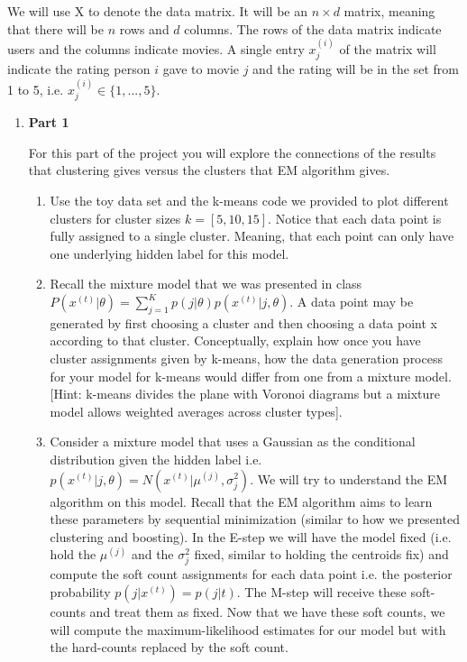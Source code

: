 We will use X to denote the data matrix. It will be an $n \times d$ matrix, meaning that there will be $n$ rows and $d$ columns. The rows of the data matrix indicate users and the columns indicate movies. A single entry $x^{(i)}_{j}$ of the matrix will indicate the rating person $i$ gave to movie $j$ and the rating will be in the set from 1 to 5, i.e. $x^{(i)}_{j} \in \{ 1, ..., 5\}$.
\begin{enumerate}

\item {\bf Part 1}

For this part of the project you will explore the connections of the results that clustering gives versus the clusters that EM algorithm gives.

\begin{enumerate}
  \item Use the toy data set and the k-means code we provided to plot different clusters for cluster sizes $k = [5, 10, 15]$. Notice that each data point is fully assigned to a single cluster. Meaning, that each point can only have one underlying hidden label for this model.
  \item Recall the mixture model that we was presented in class $P(x^{(t)} | \theta) = \sum^{K}_{j=1} p(j| \theta)p(x^{(t)} | j, \theta) $. A data point may be generated by first choosing a cluster and then choosing a data point x according to that cluster. Conceptually, explain how once you have cluster assignments given by k-means, how the data generation process for your model for k-means would differ from one from a mixture model. [Hint: k-means divides the plane with Voronoi diagrams but a mixture model allows weighted averages across cluster types].
  \item Consider a mixture model that uses a Gaussian as the conditional distribution given the hidden label i.e. $p(x^{(t)} | j, \theta) = N(x^{(t)}| \mu^{(j)}, \sigma^2_{j})$.  We will try to understand the EM algorithm on this model. 
 Recall that the EM algorithm aims to learn these parameters by sequential minimization (similar to how we presented clustering and boosting). 
In the E-step we will have the model fixed (i.e. hold the $ \mu^{(j)}$ and the $\sigma^2_{j}$ fixed, similar to holding the centroids fix) and compute the soft count assignments for each data point i.e. the posterior probability $p(j | x^{(t)}) = p(j|t)$. The M-step will receive these soft-counts and treat them as fixed. Now that we have these soft counts, we will compute the maximum-likelihood estimates for our model but with the hard-counts replaced by the soft count. 


\end{enumerate}
\end{enumerate}
